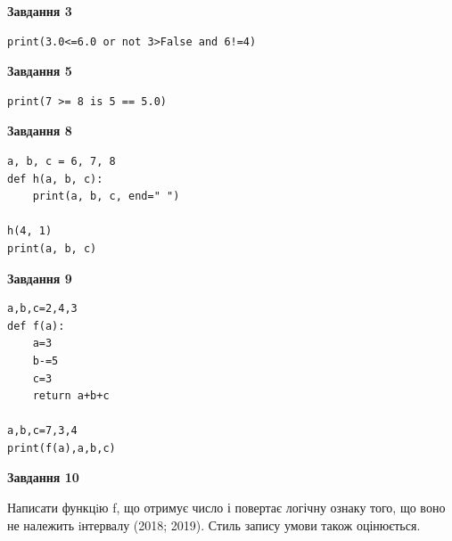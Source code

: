 \documentclass[12pt, ukrainian]{article}
\begin{document}
{\begin {large}
\begin{minipage}[t]{7.5cm}
\end{minipage}
\vline \hspace{6mm}
\begin{minipage}[t]{10.5cm}

\begin{center}
\textbf{Завдання 3}
\end{center}

\begin{verbatim}
print(3.0<=6.0 or not 3>False and 6!=4)
\end{verbatim}



\begin{center}
\textbf{Завдання 5}
\end{center}

\begin{verbatim}
print(7 >= 8 is 5 == 5.0)
\end{verbatim}



\begin{center}
\textbf{Завдання 8}
\end{center}

\begin{verbatim}
a, b, c = 6, 7, 8
def h(a, b, c):
    print(a, b, c, end=" ")

h(4, 1)
print(a, b, c)
\end{verbatim}



\begin{center}
\textbf{Завдання 9}
\end{center}

\begin{verbatim}
a,b,c=2,4,3
def f(a):
    a=3
    b-=5
    c=3
    return a+b+c

a,b,c=7,3,4
print(f(a),a,b,c)
\end{verbatim}



\begin{center}
\textbf{Завдання 10}
\end{center}

Написати функцiю f, що отримує число і повертає логічну ознаку того, що воно не належить iнтервалу (2018; 2019). Стиль запису умови також оцінюється.\par

\end{minipage}

\end {large}}
\newpage
\end{document}
